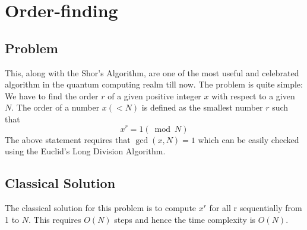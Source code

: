 \section{Order-finding}
\subsection{Problem}
This, along with the Shor's Algorithm, are one of the most useful and celebrated algorithm in the quantum computing realm till now. The problem is quite simple:  We have to find the order $r$ of a given positive integer $x$ with respect to a given $N$. The order of a number $x (<N)$ is defined as the smallest number $r$ such that
\begin{equation}
x^r = 1 (\bmod  N)
\end{equation}The above statement requires that $\gcd{(x,N)} = 1$ which can be easily checked using the Euclid's Long Division Algorithm.
\subsection{Classical Solution}
The classical solution for this problem is to compute $x^r$ for all r sequentially from  1 to $N$. This requires $O(N)$ steps and hence the time complexity is $O(N)$.
